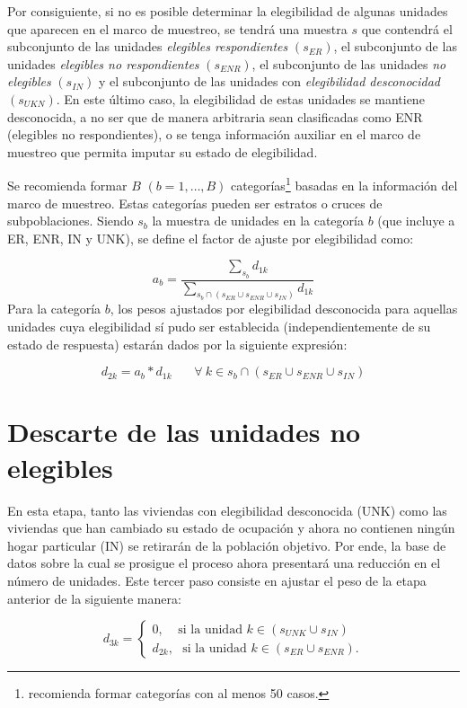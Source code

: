 \documentclass[
  12pt,
  spanish,
]{book}
\begin{document}
Por consiguiente, si no es posible determinar la elegibilidad de algunas unidades que aparecen en el marco de muestreo, se tendrá una muestra \(s\) que contendrá el subconjunto de las unidades \emph{elegibles respondientes} \((s_{ER})\), el subconjunto de las unidades \emph{elegibles no respondientes} \((s_{ENR})\), el subconjunto de las unidades \emph{no elegibles} \((s_{IN})\) y el subconjunto de las unidades con \emph{elegibilidad desconocidad} \((s_{UKN})\). En este último caso, la elegibilidad de estas unidades se mantiene desconocida, a no ser que de manera arbitraria sean clasificadas como ENR (elegibles no respondientes), o se tenga información auxiliar en el marco de muestreo que permita imputar su estado de elegibilidad.

Se recomienda formar \(B\) \((b = 1, \ldots, B)\) categorías\footnote{\citet{Valliant_Dever_2017} recomienda formar categorías con al menos 50 casos.} basadas en la información del marco de muestreo. Estas categorías pueden ser estratos o cruces de subpoblaciones. Siendo \(s_b\) la muestra de unidades en la categoría \(b\) (que incluye a ER, ENR, IN y UNK), se define el factor de ajuste por elegibilidad como:

\[
a_b = \frac{\sum_{s_b}d_{1k}}{\sum_{s_b \cap (s_{ER} \cup s_{ENR} \cup s_{IN})}d_{1k}}
\]
Para la categoría \(b\), los pesos ajustados por elegibilidad desconocida para aquellas unidades cuya elegibilidad sí pudo ser establecida (independientemente de su estado de respuesta) estarán dados por la siguiente expresión:

\[
d_{2k} = a_b * d_{1k}  \ \ \ \ \ \ \ \ \forall \ k\in s_b \cap (s_{ER} \cup s_{ENR} \cup s_{IN})
\]

\hypertarget{descarte-de-las-unidades-no-elegibles}{%
\section{Descarte de las unidades no elegibles}\label{descarte-de-las-unidades-no-elegibles}}

En esta etapa, tanto las viviendas con elegibilidad desconocida (UNK) como las viviendas que han cambiado su estado de ocupación y ahora no contienen ningún hogar particular (IN) se retirarán de la población objetivo. Por ende, la base de datos sobre la cual se prosigue el proceso ahora presentará una reducción en el número de unidades. Este tercer paso consiste en ajustar el peso de la etapa anterior de la siguiente manera:

\[
d_{3k} = 
\begin{cases}
0, \ \ \ \ \ \text{si la unidad $k \in (s_{UNK} \cup s_{IN})$ }\\
d_{2k},\ \ \ \text{si la unidad $k \in (s_{ER} \cup s_{ENR})$.}
\end{cases}
\]
\end{document}
